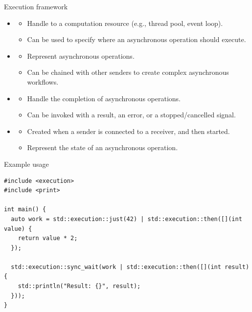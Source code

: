 \begin{frame}[t,fragile]{Execution framework}
  \begin{itemize}
    \item {}
      \begin{itemize}
        \item Handle to a computation resource (e.g., thread pool, event loop).
        \item Can be used to specify where an asynchronous operation should execute.
      \end{itemize}

    \item {}
      \begin{itemize}
        \item Represent asynchronous operations.
        \item Can be chained with other senders to create complex asynchronous workflows.
      \end{itemize}

    \item {}
      \begin{itemize}
        \item Handle the completion of asynchronous operations.
        \item Can be invoked with a result, an error, or a stopped/cancelled signal.
      \end{itemize}

    \item {}
      \begin{itemize}
        \item Created when a sender is connected to a receiver, and then started.
        \item Represent the state of an asynchronous operation.
      \end{itemize}
  \end{itemize}
\end{frame}

\begin{frame}[t,fragile]{Example usage}
\begin{lstlisting}
#include <execution>
#include <print>

int main() {
  auto work = std::execution::just(42) | std::execution::then([](int value) {
    return value * 2;
  });

  std::execution::sync_wait(work | std::execution::then([](int result) {
    std::println("Result: {}", result);
  }));
}
\end{lstlisting}
\end{frame}

